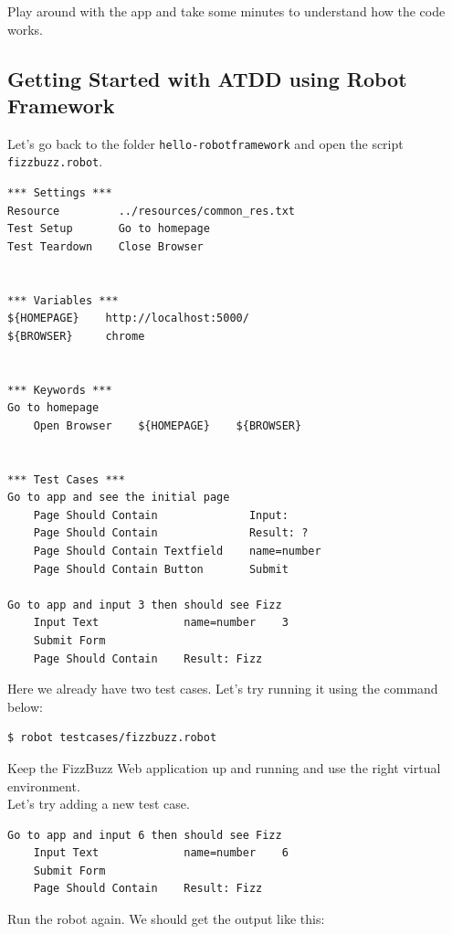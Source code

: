 \documentclass{article}
\begin{document}
\noindent Play around with the app and take some minutes to understand how the
code works.

\subsection*{Getting Started with ATDD using Robot Framework}

\noindent Let's go back to the folder {\tt hello-robotframework} and open the
script {\tt fizzbuzz.robot}.

\begin{verbatim}
*** Settings ***
Resource         ../resources/common_res.txt
Test Setup       Go to homepage
Test Teardown    Close Browser


*** Variables ***
${HOMEPAGE}    http://localhost:5000/
${BROWSER}     chrome


*** Keywords ***
Go to homepage
    Open Browser    ${HOMEPAGE}    ${BROWSER}


*** Test Cases ***
Go to app and see the initial page
    Page Should Contain              Input:
    Page Should Contain              Result: ?
    Page Should Contain Textfield    name=number
    Page Should Contain Button       Submit

Go to app and input 3 then should see Fizz
    Input Text             name=number    3
    Submit Form
    Page Should Contain    Result: Fizz
\end{verbatim}

\noindent Here we already have two test cases. Let's try running it using the
command below:

\begin{verbatim}
$ robot testcases/fizzbuzz.robot
\end{verbatim}

 Keep the FizzBuzz Web application up and running and use
the right virtual environment. \\

\noindent Let's try adding a new test case.

\begin{verbatim}
Go to app and input 6 then should see Fizz
    Input Text             name=number    6
    Submit Form
    Page Should Contain    Result: Fizz
\end{verbatim}

\noindent Run the robot again. We should get the output like this:
\end{document}
